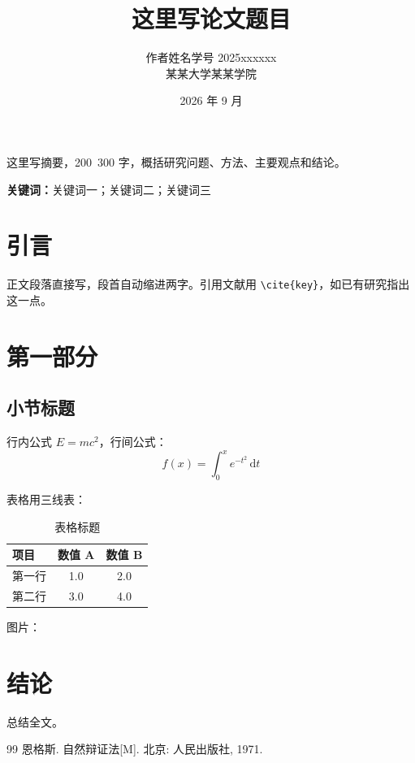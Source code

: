 \documentclass[UTF8,zihao=-4,a4paper,fontset=none]{ctexart}
\title{\sffamily\zihao{2}\bfseries 这里写论文题目}
\author{\zihao{-4}作者姓名\quad 学号 2025xxxxxx\\ \zihao{5}某某大学某某学院}
\date{\zihao{5}2026 年 9 月}
\renewenvironment{abstract}{%
  \par\begin{center}\sffamily\zihao{4}\bfseries\abstractname\end{center}\par\zihao{-4}%
}{\par\medskip}
\begin{document}
\maketitle

\begin{abstract}
这里写摘要，200~300 字，概括研究问题、方法、主要观点和结论。

\noindent\textbf{关键词：}关键词一；关键词二；关键词三
\end{abstract}

\section{引言}
正文段落直接写，段首自动缩进两字。引用文献用 \verb|\cite{key}|，如已有研究指出这一点\cite{marx1972}。

\section{第一部分}
\subsection{小节标题}
行内公式 $E = mc^2$，行间公式：
\begin{equation}
  f(x) = \int_{0}^{x} e^{-t^2}\,\mathrm{d}t
\end{equation}

表格用三线表：
\begin{table}[htbp]
  \centering
  \caption{表格标题}
  \begin{tabular}{lcc}
    \toprule
    项目 & 数值 A & 数值 B \\
    \midrule
    第一行 & 1.0 & 2.0 \\
    第二行 & 3.0 & 4.0 \\
    \bottomrule
  \end{tabular}
\end{table}

图片：

\section{结论}
总结全文。

\begin{thebibliography}{99}
   恩格斯. 自然辩证法[M]. 北京: 人民出版社, 1971.
\end{thebibliography}
\end{document}

